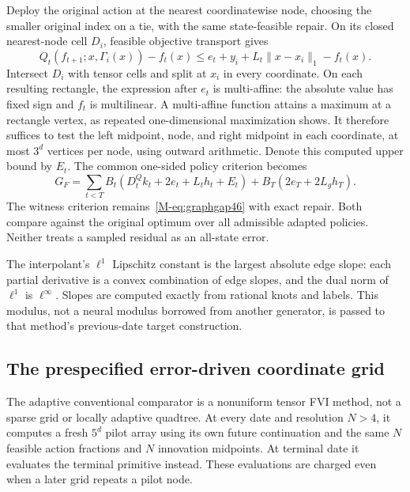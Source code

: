 Deploy the original action at the nearest coordinatewise node, choosing the smaller original index on a tie, with the same state-feasible repair. On its closed nearest-node cell $D_i$, feasible objective transport gives
\[
 Q_t(f_{t+1};x,\Gamma_i(x))-f_t(x)
 \le e_t+y_i+L_t\|x-x_i\|_1-f_t(x).
\]
Intersect $D_i$ with tensor cells and split at $x_i$ in every coordinate. On each resulting rectangle, the expression after $e_t$ is multi-affine: the absolute value has fixed sign and $f_t$ is multilinear. A multi-affine function attains a maximum at a rectangle vertex, as repeated one-dimensional maximization shows. It therefore suffices to test the left midpoint, node, and right midpoint in each coordinate, at most $3^d$ vertices per node, using outward arithmetic. Denote this computed upper bound by $E_t$. The common one-sided policy criterion becomes
\begin{equation}\label{eq:fvi48}
 G_F=\sum_{t<T}B_t(D_t^Qk_t+2e_t+L_th_t+E_t)
        +B_T(2e_T+2L_gh_T).
\end{equation}
The witness criterion remains~\eqref{M-eq:graphgap46} with exact repair. Both compare against the original optimum over all admissible adapted policies. Neither treats a sampled residual as an all-state error.

The interpolant's $\ell^1$ Lipschitz constant is the largest absolute edge slope: each partial derivative is a convex combination of edge slopes, and the dual norm of $\ell^1$ is $\ell^\infty$. Slopes are computed exactly from rational knots and labels. This modulus, not a neural modulus borrowed from another generator, is passed to that method's previous-date target construction.

\subsection{The prespecified error-driven coordinate grid}
The adaptive conventional comparator is a nonuniform tensor FVI method, not a sparse grid or locally adaptive quadtree. At every date and resolution $N>4$, it computes a fresh $5^d$ pilot array using its own future continuation and the same $N$ feasible action fractions and $N$ innovation midpoints. At terminal date it evaluates the terminal primitive instead. These evaluations are charged even when a later grid repeats a pilot node.

